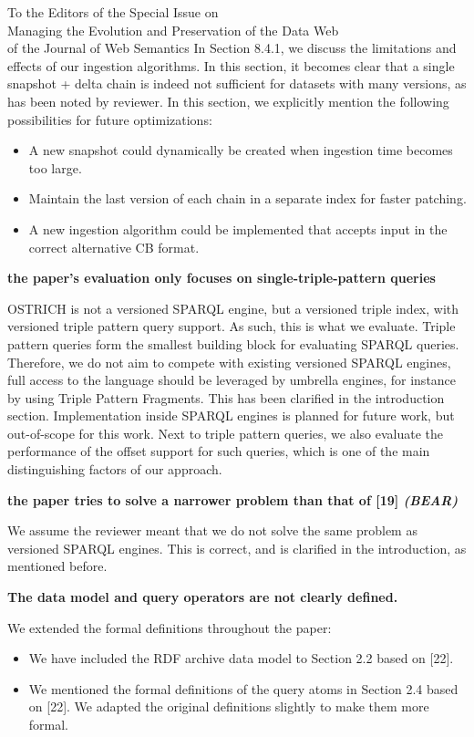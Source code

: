\documentclass{letter}
\newcounter{section}
\begin{document}
\begin{letter}{To the Editors of the Special Issue on\\Managing the Evolution and Preservation of the Data Web\\of the Journal of Web Semantics}
In Section 8.4.1, we discuss the limitations and effects of our ingestion algorithms.
In this section, it becomes clear that a single snapshot + delta chain is indeed not sufficient for datasets with many versions,
as has been noted by reviewer.
In this section, we explicitly mention the following possibilities for future optimizations:
\begin{itemize}
    \item A new snapshot could dynamically be created when ingestion time becomes too large.
    \item Maintain the last version of each chain in a separate index for faster patching.
    \item A new ingestion algorithm could be implemented that accepts input in the correct alternative CB format.
\end{itemize}

\textbf{the paper's evaluation only focuses on single-triple-pattern queries}

OSTRICH is not a versioned SPARQL engine, but a versioned triple index,
with versioned triple pattern query support.
As such, this is what we evaluate.
Triple pattern queries form the smallest building block for evaluating SPARQL queries.
Therefore, we do not aim to compete with existing versioned SPARQL engines,
full access to the language should be leveraged by umbrella engines,
for instance by using Triple Pattern Fragments.
This has been clarified in the introduction section.
Implementation inside SPARQL engines is planned for future work, but out-of-scope for this work.
Next to triple pattern queries,
we also evaluate the performance of the offset support for such queries,
which is one of the main distinguishing factors of our approach.

\textbf{the paper tries to solve a narrower problem than that of [19] \emph{(BEAR)}}

We assume the reviewer meant that we do not solve the same problem as versioned SPARQL engines.
This is correct, and is clarified in the introduction, as mentioned before.

\textbf{The data model and query operators are not clearly defined.}

We extended the formal definitions throughout the paper:
\begin{itemize}
    \item We have included the RDF archive data model to Section 2.2 based on [22].
    \item We mentioned the formal definitions of the query atoms in Section 2.4 based on [22]. We adapted the original definitions slightly to make them more formal.
\end{itemize}


\end{letter}
\end{document}
